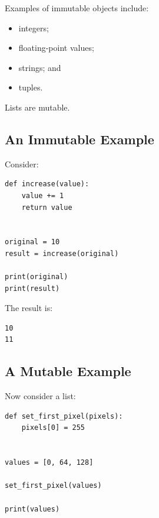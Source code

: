 Examples of immutable objects include:

\begin{itemize}
    \item integers;
    \item floating-point values;
    \item strings; and
    \item tuples.
\end{itemize}

Lists are mutable.


\subsection{An Immutable Example}

Consider:

\begin{listing}[htbp]
    \caption{Passing an integer to a function.}
    \label{lst:immutable-argument}

\begin{verbatim}
def increase(value):
    value += 1
    return value


original = 10
result = increase(original)

print(original)
print(result)
\end{verbatim}

\end{listing}

The result is:

\begin{verbatim}
10
11
\end{verbatim}


\subsection{A Mutable Example}

Now consider a list:

\begin{listing}[htbp]
    \caption{Modifying a mutable list inside a function.}
    \label{lst:mutable-argument}

\begin{verbatim}
def set_first_pixel(pixels):
    pixels[0] = 255


values = [0, 64, 128]

set_first_pixel(values)

print(values)
\end{verbatim}

\end{listing}

